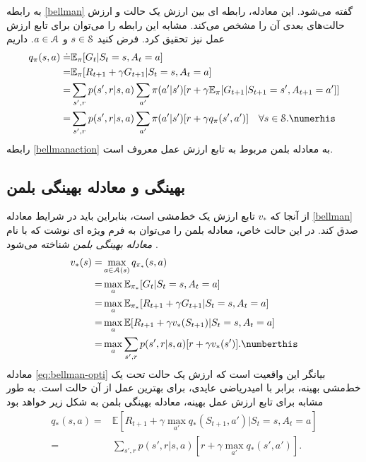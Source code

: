 به رابطه 
 \ref{bellman}
 گفته می‌شود. این معادله، رابطه ای بین ارزش یک حالت و ارزش حالت‌های بعدی آن را مشخص می‌کند. مشابه این رابطه را می‌توان برای تابع ارزش عمل نیز تحقیق کرد. فرض کنید 
$s \in \EuScript{S}$
 و 
 $a \in \EuScript{A}$.
 داریم
\begin{align}
q_\pi (s,a) \doteq& \mathbb{E}_\pi [G_t | S_t = s, A_t = a] \nonumber \\
=& \mathbb{E}_\pi [R_{t+1}+ \gamma G_{t+1}|S_t=s, A_t = a] \nonumber \\
=&\sum_{s',r} p(s',r|s,a) \sum_{a'} \pi(a'|s')[r+\gamma \mathbb{E}_\pi[G_{t+1}|S_{t+1}=s', A_{t+1} = a']] \nonumber\\
=&\sum_{s',r}  p(s',r|s,a) \sum_{a'} \pi(a'|s')[r+\gamma q_\pi(s',a')] \quad \forall s \in \EuScript{S}. \numerhis 
\label{bellmanaction}
\end{align}
رابطه \ref{bellmanaction} به معادله بلمن مربوط به تابع ارزش عمل معروف است.
\subsection{بهینگی و معادله بهینگی بلمن}

از آنجا که $v_*$ تابع ارزش یک خط‌مشی است، بنابراین باید در شرایط معادله \ref{bellman} صدق کند.
در این حالت خاص، معادله بلمن را می‌توان به فرم ویژه ای نوشت که با نام
 \textit{معادله بهینگی بلمن}
شناخته می‌شود \cite{suttonbook}.
\begin{align}
  v_{*}(s)= &\max_{a \in \EuScript{A}(s)} q_{\pi_*}(s,a) \nonumber \\
      =& \max_{a} \mathbb{E}_{\pi_*} [G_t|S_t=s, A_t=a] \nonumber \\ 
      =& \max_{a} \mathbb{E}_{\pi_*} [R_{t+1} + \gamma G_{t+1} | S_t=s, A_t=a] \nonumber \\ 
      =& \max_{a} \mathbb{E} [R_{t+1} + \gamma v_*(S_{t+1}) | S_t= s, A_t = a] \nonumber \\
      =& \max_{a} \sum_{s',r} p(s',r|s,a) [r + \gamma v_*(s')]. \numberthis
\label{eq:bellman-opti}
\end{align}
معادله 
\ref{eq:bellman-opti}
 بیانگر این واقعیت است که ارزش یک حالت تحت یک خط‌مشی بهینه، برابر با امیدریاضی عایدی، برای بهترین عمل از آن حالت است. به طور مشابه برای تابع ارزش عمل بهینه، معادله بهینگی بلمن به شکل زیر خواهد بود \cite{suttonbook}
\begin{align}
q_*(s,a) =& \mathbb{E}\left[R_{t+1} + \gamma \max_{a'} q_*(S_{t+1},a')| S_t=s, A_t=a \right] \nonumber\\
=& \sum_{s',r} p(s',r|s,a) \left[r + \gamma \max_{a'} q_*(s',a')\right] 
\label{eq:2}.
\end{align}

